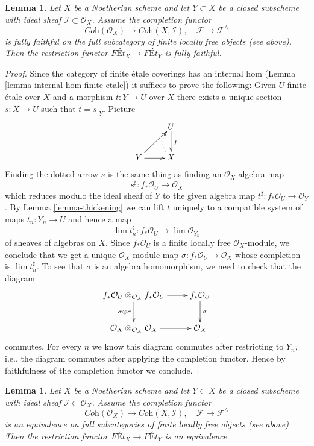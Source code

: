 \documentclass{stacks-project}
\theoremstyle{plain}
\newtheorem{lemma}[subsection]{Lemma}
\theoremstyle{definition}
\theoremstyle{remark}
\numberwithin{equation}{subsection}
\def\lim{\mathop{\mathrm{lim}}\nolimits}
\begin{document}
\begin{lemma}
\label{lemma-restriction-fully-faithful}
Let $X$ be a Noetherian scheme and let $Y \subset X$ be a closed subscheme
with ideal sheaf $\mathcal{I} \subset \mathcal{O}_X$.
Assume the completion functor
$$
\textit{Coh}(\mathcal{O}_X)
\longrightarrow 
\textit{Coh}(X, \mathcal{I}),\quad
\mathcal{F} \longmapsto \mathcal{F}^\wedge
$$
is fully faithful on the full subcategory of finite locally free objects
(see above).
Then the restriction functor $\textit{F\'Et}_X \to \textit{F\'Et}_Y$
is fully faithful.
\end{lemma}

\begin{proof}
Since the category of finite \'etale coverings has an
internal hom (Lemma \ref{lemma-internal-hom-finite-etale})
it suffices to prove the following: Given $U$ finite \'etale over $X$
and a morphism $t : Y \to U$ over $X$ there exists a unique section
$s : X \to U$ such that $t = s|_Y$. Picture
$$
\xymatrix{
& U \ar[d]^f \\
Y \ar[r] \ar[ru] & X \ar@{..>}@/^1em/[u]
}
$$
Finding the dotted arrow $s$ is the same thing as finding an
$\mathcal{O}_X$-algebra map
$$
s^\sharp : f_*\mathcal{O}_U \longrightarrow \mathcal{O}_X
$$
which reduces modulo the ideal sheaf of $Y$ to the given algebra map
$t^\sharp : f_*\mathcal{O}_U \to \mathcal{O}_Y$.
By Lemma \ref{lemma-thickening} we can lift $t$ uniquely to a compatible
system of maps $t_n : Y_n \to U$ and hence a map
$$
\lim t_n^\sharp : f_*\mathcal{O}_U \longrightarrow \lim \mathcal{O}_{Y_n}
$$
of sheaves of algebras on $X$.
Since $f_*\mathcal{O}_U$ is a finite locally free $\mathcal{O}_X$-module,
we conclude that we get a unique $\mathcal{O}_X$-module map
$\sigma : f_*\mathcal{O}_U \to \mathcal{O}_X$ whose completion
is $\lim t_n^\sharp$. To see that $\sigma$ is an algebra homomorphism,
we need to check that the diagram
$$
\xymatrix{
f_*\mathcal{O}_U \otimes_{\mathcal{O}_X} f_*\mathcal{O}_U
\ar[r] \ar[d]_{\sigma \otimes \sigma} &
f_*\mathcal{O}_U \ar[d]^\sigma \\
\mathcal{O}_X \otimes_{\mathcal{O}_X} \mathcal{O}_X \ar[r] &
\mathcal{O}_X
}
$$
commutes. For every $n$ we know this diagram commutes after restricting
to $Y_n$, i.e., the diagram commutes after applying the completion functor.
Hence by faithfulness of the completion functor we conclude.
\end{proof}

\begin{lemma}
\label{lemma-restriction-equivalence}
Let $X$ be a Noetherian scheme and let $Y \subset X$ be a closed subscheme
with ideal sheaf $\mathcal{I} \subset \mathcal{O}_X$.
Assume the completion functor
$$
\textit{Coh}(\mathcal{O}_X)
\longrightarrow 
\textit{Coh}(X, \mathcal{I}),\quad
\mathcal{F} \longmapsto \mathcal{F}^\wedge
$$
is an equivalence on full subcategories of finite locally free objects
(see above).
Then the restriction functor $\textit{F\'Et}_X \to \textit{F\'Et}_Y$
is an equivalence.
\end{lemma}
\end{document}
